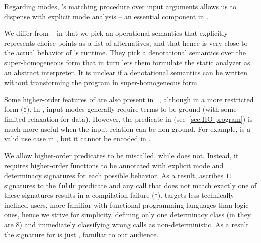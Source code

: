 Regarding modes, \elpi's matching procedure over input arguments allows us to
dispense with explicit mode analysis -- an essential component in
\cite{warren1989,lopez2005,somogy1996,king2011}.

We differ from \redalert~\cite{king2011} in that we pick an operational semantics that
explicitly represents choice points as a list of alternatives, and that
hence is very close to the actual behavior of \elpi's runtime. They pick a
denotational semantics over the super-homogeneous form
that in turn lets them  formulate
the static analyzer as an abstract interpreter. It is unclear if a denotational
semantics can be written without transforming the program in super-homogeneous form.

Some higher-order features of \elpi are also present in \mercury~\cite{somogy1996},
although in a more restricted form ($\ddagger$). In \mercury, input modes
generally require terms to be ground (with some limited relaxation for data).
However, the predicate  in \elpi (see~\cref{sec:HO-program}) is much
more useful when the input relation can be non-ground. For example,
 is a valid use case in \elpi, but it cannot be
encoded in \mercury.

We allow higher-order predicates to
be miscalled, while \mercury does not.
Instead, it requires higher-order functions to be annotated with explicit
mode and determinacy signatures for each possible behavior. As a result, \mercury
ascribes
\href{https://github.com/Mercury-Language/mercury/blob/5900de3e8c1bc1dcc75799b350b381ff9b9774f2/library/list.m#L1587C1-L1597C75}{$11$ signatures}
to the \texttt{foldr} predicate
and any call that does not match exactly one of these signatures results in a
compilation failure ($\dagger$). %
\elpi targets less technically inclined users, more familiar with functional programming languages
than logic ones, hence we strive for simplicity,
defining only one determinacy class (in \mercury they are 
$8$) and immediately classifying wrong calls as
non-deterministic.
As a result the signature for  is just
,
 familiar to our audience.

